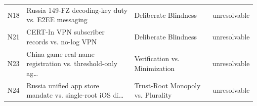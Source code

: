 \begin{table}[t]
\begin{tabular}{llll}
  N18 & Russia 149-FZ decoding-key duty vs. E2EE messaging & Deliberate Blindness & unresolvable \\
  N21 & CERT-In VPN subscriber records vs. no-log VPN & Deliberate Blindness & unresolvable \\
  N23 & China game real-name registration vs. threshold-only ag… & Verification vs. Minimization & unresolvable \\
  N24 & Russia unified app store mandate vs. single-root iOS di… & Trust-Root Monopoly vs. Plurality & unresolvable \\
\bottomrule
\end{tabular}
\end{table}